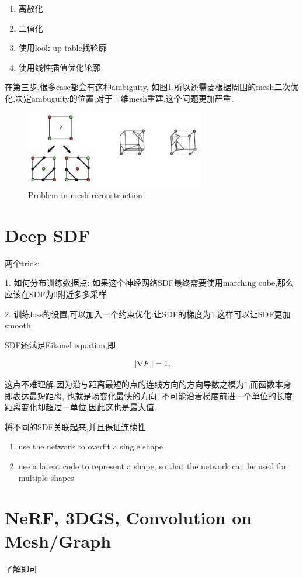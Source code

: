 \begin{enumerate}
    \item 离散化
    \item 二值化
    \item 使用look-up table找轮廓
    \item 使用线性插值优化轮廓
\end{enumerate}

在第三步,很多case都会有这种ambiguity, 如图\ref{fig:mesh reconstruction},所以还需要根据周围的mesh二次优化,决定ambuguity的位置,对于三维mesh重建,这个问题更加严重.

\begin{figure}[H]
    \centering
    \includegraphics[width=0.7\textwidth]{figures/holes.png}
    \caption{Problem in mesh reconstruction}
    \label{fig:mesh reconstruction}
\end{figure}

\section{Deep SDF}

两个trick:

1. 如何分布训练数据点: 如果这个神经网络SDF最终需要使用marching cube,那么应该在SDF为0附近多多采样

2. 训练loss的设置,可以加入一个约束优化:让SDF的梯度为1.这样可以让SDF更加smooth

SDF还满足Eikonel equation,即

\begin{equation}
    \left \Vert \nabla F \right \Vert = 1.
\end{equation}

这点不难理解,因为沿与距离最短的点的连线方向的方向导数之模为$1$,而函数本身即表达最短距离, 也就是场变化最快的方向,
不可能沿着梯度前进一个单位的长度,距离变化却超过一单位,因此这也是最大值.

将不同的SDF关联起来,并且保证连续性\cite{Park2019CVPR}

\begin{enumerate}
    \item  use the network to overfit a single shape
    \item use a latent code to represent a shape, so that the
    network can be used for multiple shapes
\end{enumerate}

\section{NeRF, 3DGS, Convolution on Mesh/Graph}

了解即可